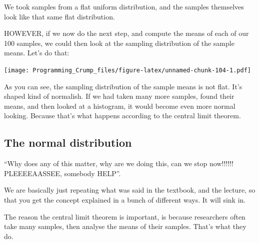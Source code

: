 \documentclass[]{book}
\newenvironment{Shaded}{\begin{snugshade}}{\end{snugshade}}
\newcommand{\KeywordTok}[1]{\textcolor[rgb]{0.13,0.29,0.53}{\textbf{{#1}}}}
\newcommand{\DataTypeTok}[1]{\textcolor[rgb]{0.13,0.29,0.53}{{#1}}}
\newcommand{\DecValTok}[1]{\textcolor[rgb]{0.00,0.00,0.81}{{#1}}}
\newcommand{\StringTok}[1]{\textcolor[rgb]{0.31,0.60,0.02}{{#1}}}
\newcommand{\CommentTok}[1]{\textcolor[rgb]{0.56,0.35,0.01}{\textit{{#1}}}}
\newcommand{\NormalTok}[1]{{#1}}
\theoremstyle{definition}
\theoremstyle{definition}
\theoremstyle{definition}
\theoremstyle{remark}
\begin{document}
We took samples from a flat uniform distribution, and the samples
themselves look like that same flat distribution.

HOWEVER, if we now do the next step, and compute the means of each of
our 100 samples, we could then look at the sampling distribution of the
sample means. Let's do that:

\begin{Shaded}
\end{Shaded}

\texttt{[image: Programming\_Crump\_files/figure-latex/unnamed-chunk-104-1.pdf]}

As you can see, the sampling distribution of the sample means is not
flat. It's shaped kind of normalish. If we had taken many more samples,
found their means, and then looked at a histogram, it would become even
more normal looking. Because that's what happens according to the
central limit theorem.

\subsection{The normal distribution}\label{the-normal-distribution}

``Why does any of this matter, why are we doing this, can we stop
now!!!!!! PLEEEEAASSEE, somebody HELP''.

We are basically just repeating what was said in the textbook, and the
lecture, so that you get the concept explained in a bunch of different
ways. It will sink in.

The reason the central limit theorem is important, is because
researchers often take many samples, then analyse the means of their
samples. That's what they do.
\end{document}
